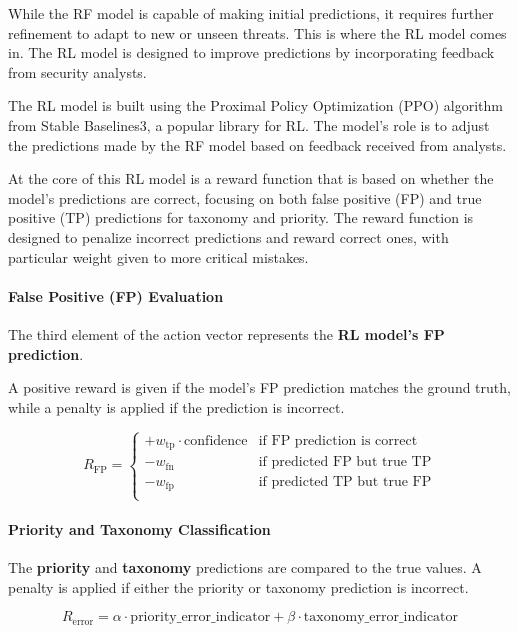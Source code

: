While the RF model is capable of making initial predictions, it requires further refinement to adapt to new or unseen threats. 
This is where the RL model comes in. The RL model is designed to improve predictions by incorporating feedback from security analysts.

The RL model is built using the Proximal Policy Optimization (PPO) algorithm from Stable Baselines3, a popular library for RL. 
The model's role is to adjust the predictions made by the RF model based on feedback received from analysts. 

At the core of this RL model is a reward function that is based on whether the model's predictions are correct, focusing on both false positive (FP) and true positive (TP) predictions for taxonomy and priority. 
The reward function is designed to penalize incorrect predictions and reward correct ones, with particular weight given to more critical mistakes.

\paragraph{False Positive (FP) Evaluation}
The third element of the action vector represents the \textbf{RL model's FP prediction}. 

A positive reward is given if the model's FP prediction matches the ground truth, while a penalty is applied if the prediction is incorrect.

\[
R_{\text{FP}} = 
\begin{cases} 
+ w_{\text{tp}} \cdot \text{confidence} & \text{if FP prediction is correct} \\
- w_{\text{fn}} & \text{if predicted FP but true TP} \\
- w_{\text{fp}} & \text{if predicted TP but true FP} \\
\end{cases}
\label{eq:fp_reward}
\]

\paragraph{Priority and Taxonomy Classification}
The \textbf{priority} and \textbf{taxonomy} predictions are compared to the true values. A penalty is applied if either the priority or taxonomy prediction is incorrect.

\[
R_{\text{error}} = \alpha \cdot \text{priority\_error\_indicator} + \beta \cdot \text{taxonomy\_error\_indicator}
\label{eq:error_penalty}
\]

